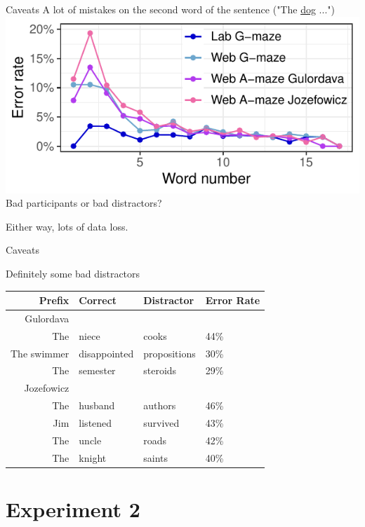 \documentclass[12pt, xcolor=beamer,table,usenames,dvipsnames, ignorenonframetext, ngerman]{beamer}
\begin{document}
\begin{frame}{Caveats}
A lot of mistakes on the second word of the sentence ("The \ul{dog} ...") \pause
\includegraphics{graph_errors2.pdf} \pause
Bad participants or bad distractors? 

Either way, lots of data loss.
\end{frame}

\begin{frame}{Caveats}

{\large Definitely some bad distractors}
\begin{table}
	
		
		\begin{tabular}{rlll}
			Prefix & Correct & Distractor & Error Rate \\
			\hline
			\hline
			Gulordava&&&\\
			\hline
			The & niece & cooks & 44\%\\
			The swimmer & disappointed & propositions & 30\%\\
			The & semester & steroids & 29\%\\
			\hline
			\hline
			 Jozefowicz&&&\\
			\hline
			The & husband & authors & 46\%\\
			Jim & listened & survived & 43\%\\
			The & uncle & roads & 42\%\\
			The & knight & saints & 40\%\\
		\end{tabular}
\end{table}

\end{frame}

\section{Experiment 2}
\end{document}
